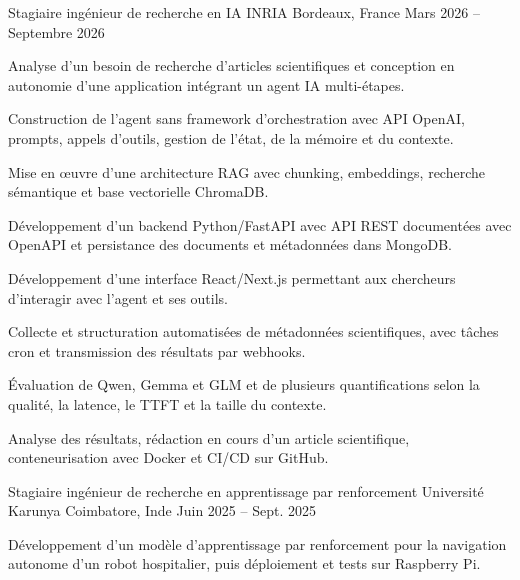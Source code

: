 
\begin{cventries}
  \cventry
    {Stagiaire ingénieur de recherche en IA}
    {INRIA}
    {Bordeaux, France}
    {Mars 2026 -- Septembre 2026}
    {
      \begin{cvitems}
        \item {Analyse d’un besoin de recherche d’articles scientifiques et conception en autonomie d’une application intégrant un agent IA multi-étapes.}
        \item {Construction de l’agent sans framework d’orchestration avec API OpenAI, prompts, appels d’outils, gestion de l’état, de la mémoire et du contexte.}
        \item {Mise en œuvre d’une architecture RAG avec chunking, embeddings, recherche sémantique et base vectorielle ChromaDB.}
        \item {Développement d’un backend Python/FastAPI avec API REST documentées avec OpenAPI et persistance des documents et métadonnées dans MongoDB.}
        \item {Développement d’une interface React/Next.js permettant aux chercheurs d’interagir avec l’agent et ses outils.}
        \item {Collecte et structuration automatisées de métadonnées scientifiques, avec tâches cron et transmission des résultats par webhooks.}
        \item {Évaluation de Qwen, Gemma et GLM et de plusieurs quantifications selon la qualité, la latence, le TTFT et la taille du contexte.}
        \item {Analyse des résultats, rédaction en cours d’un article scientifique, conteneurisation avec Docker et CI/CD sur GitHub.}
      \end{cvitems}
    }

  \cventry
    {Stagiaire ingénieur de recherche en apprentissage par renforcement}
    {Université Karunya}
    {Coimbatore, Inde}
    {Juin 2025 -- Sept. 2025}
    {
      \begin{cvitems}
        \item {Développement d’un modèle d’apprentissage par renforcement pour la navigation autonome d’un robot hospitalier, puis déploiement et tests sur Raspberry Pi.}
      \end{cvitems}
    }
\end{cventries}
